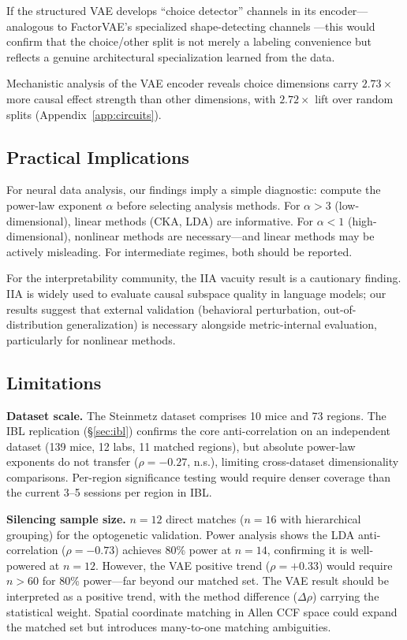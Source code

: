 \documentclass{article}
\begin{document}
If the structured VAE develops ``choice detector'' channels in its encoder---analogous to FactorVAE's specialized shape-detecting channels \citep{martinez2025vae_circuits}---this would confirm that the choice/other split is not merely a labeling convenience but reflects a genuine architectural specialization learned from the data.

Mechanistic analysis of the VAE encoder reveals choice dimensions carry $2.73\times$ more causal effect strength than other dimensions, with $2.72\times$ lift over random splits (Appendix~\ref{app:circuits}).

\subsection{Practical Implications}

For neural data analysis, our findings imply a simple diagnostic: compute the power-law exponent $\alpha$ before selecting analysis methods. For $\alpha > 3$ (low-dimensional), linear methods (CKA, LDA) are informative. For $\alpha < 1$ (high-dimensional), nonlinear methods are necessary---and linear methods may be actively misleading. For intermediate regimes, both should be reported.

For the interpretability community, the IIA vacuity result is a cautionary finding. IIA is widely used to evaluate causal subspace quality in language models; our results suggest that external validation (behavioral perturbation, out-of-distribution generalization) is necessary alongside metric-internal evaluation, particularly for nonlinear methods.

\subsection{Limitations}

\textbf{Dataset scale.} The Steinmetz dataset comprises 10 mice and 73 regions. The IBL replication (\S\ref{sec:ibl}) confirms the core anti-correlation on an independent dataset (139 mice, 12 labs, 11 matched regions), but absolute power-law exponents do not transfer ($\rho = -0.27$, n.s.), limiting cross-dataset dimensionality comparisons. Per-region significance testing would require denser coverage than the current 3--5 sessions per region in IBL.

\textbf{Silencing sample size.} $n = 12$ direct matches ($n = 16$ with hierarchical grouping) for the optogenetic validation. Power analysis shows the LDA anti-correlation ($\rho = -0.73$) achieves 80\% power at $n = 14$, confirming it is well-powered at $n = 12$. However, the VAE positive trend ($\rho = +0.33$) would require $n > 60$ for 80\% power---far beyond our matched set. The VAE result should be interpreted as a positive trend, with the method difference ($\Delta\rho$) carrying the statistical weight. Spatial coordinate matching in Allen CCF space could expand the matched set but introduces many-to-one matching ambiguities.
\end{document}

